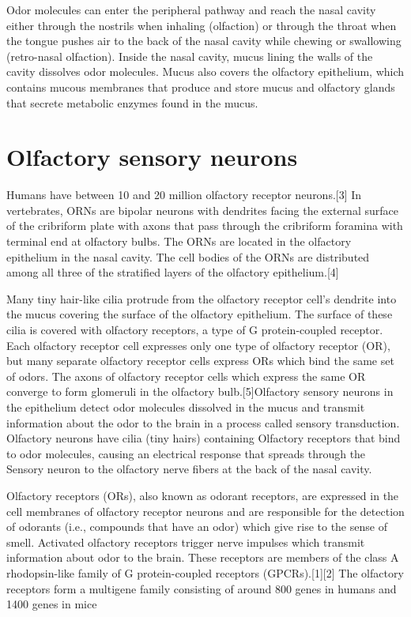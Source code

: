 Odor molecules can enter the peripheral pathway and reach the nasal cavity either through the nostrils when inhaling (olfaction) or through the throat when the tongue pushes air to the back of the nasal cavity while chewing or swallowing (retro-nasal olfaction). Inside the nasal cavity, mucus lining the walls of the cavity dissolves odor molecules. Mucus also covers the olfactory epithelium, which contains mucous membranes that produce and store mucus and olfactory glands that secrete metabolic enzymes found in the mucus.

\hypertarget{olfactory-sensory-neurons}{%
\section{Olfactory sensory neurons}\label{olfactory-sensory-neurons}}

Humans have between 10 and 20 million olfactory receptor neurons.{[}3{]} In vertebrates, ORNs are bipolar neurons with dendrites facing the external surface of the cribriform plate with axons that pass through the cribriform foramina with terminal end at olfactory bulbs. The ORNs are located in the olfactory epithelium in the nasal cavity. The cell bodies of the ORNs are distributed among all three of the stratified layers of the olfactory epithelium.{[}4{]}

Many tiny hair-like cilia protrude from the olfactory receptor cell's dendrite into the mucus covering the surface of the olfactory epithelium. The surface of these cilia is covered with olfactory receptors, a type of G protein-coupled receptor. Each olfactory receptor cell expresses only one type of olfactory receptor (OR), but many separate olfactory receptor cells express ORs which bind the same set of odors. The axons of olfactory receptor cells which express the same OR converge to form glomeruli in the olfactory bulb.{[}5{]}Olfactory sensory neurons in the epithelium detect odor molecules dissolved in the mucus and transmit information about the odor to the brain in a process called sensory transduction. Olfactory neurons have cilia (tiny hairs) containing Olfactory receptors that bind to odor molecules, causing an electrical response that spreads through the Sensory neuron to the olfactory nerve fibers at the back of the nasal cavity.

Olfactory receptors (ORs), also known as odorant receptors, are expressed in the cell membranes of olfactory receptor neurons and are responsible for the detection of odorants (i.e., compounds that have an odor) which give rise to the sense of smell. Activated olfactory receptors trigger nerve impulses which transmit information about odor to the brain. These receptors are members of the class A rhodopsin-like family of G protein-coupled receptors (GPCRs).{[}1{]}{[}2{]} The olfactory receptors form a multigene family consisting of around 800 genes in humans and 1400 genes in mice

